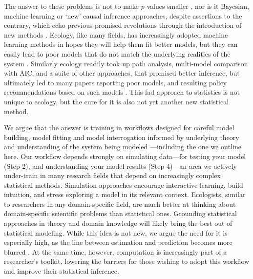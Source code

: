 \documentclass[11pt]{article}
\begin{document}
The answer to these problems is not to make $p$-values smaller \citep{halsey2015,colquhoun2017}, nor is it Bayesian, machine learning or `new' causal inference approaches, despite assertions to the contrary, which echo previous promised revolutions through the introduction of new methods \citep[e.g.,][]{mitchell1992testing,Burnham2004,byrnes2025causal}. %
Ecology, like many fields, has increasingly adopted machine learning methods in hopes they will help them fit better models, but they can easily lead to poor models that do not match the underlying realities of the system \citep{efron2020prediction,pichler2023machine}. Similarly ecology readily took up path analysis, multi-model comparison with AIC, and a suite of other approaches, that promised better inference, but ultimately led to many papers reporting poor models, and resulting policy recommendations based on such models \citep{petraitis1996inferring,leroux2019prevalence}. This fad approach to statistics is not unique to ecology, but the cure for it is also not yet another new statistical method.

We argue that the answer is training in workflows designed for careful model building, model fitting and model interrogation informed by underlying theory and understanding of the system being modeled \citep{betanworkflow,gelman2020bayesian,vandeschoot2021}---including the one we outline here. Our workflow depends strongly on simulating data---for testing your model (Step 2), and understanding your model results (Step 4)---an area we actively under-train in many research fields that depend on increasingly complex statistical methods. Simulation approaches encourage interactive learning, build intuition, and stress exploring a model in its relevant context. Ecologists, similar to researchers in any domain-specific field, are much better at thinking about domain-specific scientific problems than statistical ones. Grounding statistical approaches in theory and domain knowledge will likely bring the best out of statistical modeling. While this idea is not new, we argue the need for it is especially high, as the line between estimation and prediction becomes more blurred \citep{shmueli2010explain}. At the same time, however, computation is increasingly part of a researcher's toolkit, lowering the barriers for those wishing to adopt this workflow and improve their statistical inference. 
\end{document}
